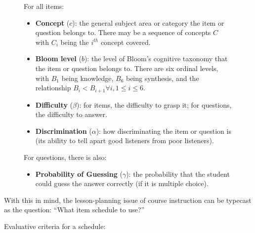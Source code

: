 \documentclass{article}
\begin{document}
 \begin{figure}

      \label{properties}

     For all items:

     \begin{itemize}

      \item \textbf{Concept} ($c$): the general subject area or category the item
      or question belongs to. There may be a sequence of concepts $C$ with $C_i$
      being the $i^{th}$ concept covered. 

      \item \textbf{Bloom level} ($b$): the level of Bloom's cognitive taxonomy
      that the item or question belongs to.  There are six ordinal levels, with
      $B_1$ being knowledge, $B_6$ being synthesis, and the relationship $B_i <
      B_{i+1} \forall i, 1 \leq i \leq 6$.

      \item \textbf{Difficulty} ($\beta$): for items, the difficulty to grasp it;
      for questions, the difficulty to answer.

      \item \textbf{Discrimination} ($\alpha$): how discriminating the item or
      question is (its ability to tell apart good listeners from poor listeners).

     \end{itemize} 

     For questions, there is also:

     \begin{itemize}

      \item \textbf{Probability of Guessing} ($\gamma$): the probability that the
      student could guess the answer correctly (if it is multiple choice).
      
     \end{itemize}

 \end{figure}

With this in mind, the lesson-planning issue of course instruction can be
typecast as the question: ``What item schedule to use?''

Evaluative criteria for a schedule:
\end{document}
